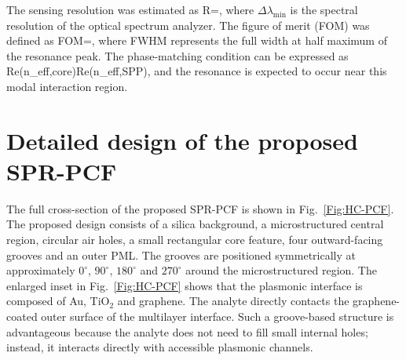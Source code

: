 \documentclass[5p,times,twocolumn]{elsarticle}
\def\mathrm#1{#1}%
\let\oldequation\equation
\let\oldendequation\endequation
\renewenvironment{equation}
  {\linenomathNonumbers\oldequation}
  {\oldendequation\endlinenomath}
\begin{document}
The sensing resolution was estimated as
\begin{equation}
R=\frac{\Delta n_a\Delta\lambda_{\min}}{\Delta\lambda_{\mathrm{res}}},
\label{eq:resolution}
\end{equation}
where $\Delta\lambda_{\min}$ is the spectral resolution of the optical spectrum analyzer. The figure of merit (FOM) was defined as
\begin{equation}
\mathrm{FOM}=\frac{S_{\lambda}}{\mathrm{FWHM}},
\label{eq:fom}
\end{equation}
where FWHM represents the full width at half maximum of the resonance peak. The phase-matching condition can be expressed as
\begin{equation}
\mathrm{Re}\left(n_{\mathrm{eff,core}}\right)\approx \mathrm{Re}\left(n_{\mathrm{eff,SPP}}\right),
\label{eq:phase_match}
\end{equation}
and the resonance is expected to occur near this modal interaction region.

\section{Detailed design of the proposed SPR-PCF}
\label{sec:Design}


The full cross-section of the proposed SPR-PCF is shown in Fig.~\ref{Fig:HC-PCF}. The proposed design consists of a silica background, a microstructured central region, circular air holes, a small rectangular core feature, four outward-facing grooves and an outer PML. The grooves are positioned symmetrically at approximately $0^{\circ}$, $90^{\circ}$, $180^{\circ}$ and $270^{\circ}$ around the microstructured region. The enlarged inset in Fig.~\ref{Fig:HC-PCF} shows that the plasmonic interface is composed of Au, TiO$_2$ and graphene. The analyte directly contacts the graphene-coated outer surface of the multilayer interface. Such a groove-based structure is advantageous because the analyte does not need to fill small internal holes; instead, it interacts directly with accessible plasmonic channels.
\end{document}

